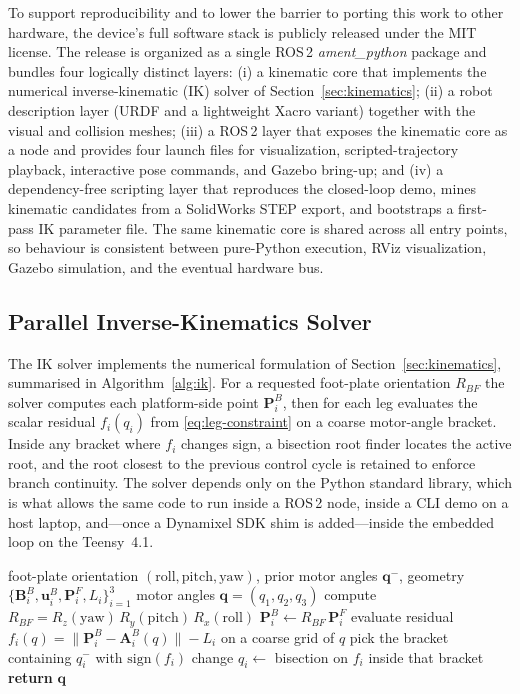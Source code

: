 \documentclass[conference]{IEEEtran}
\begin{document}
To support reproducibility and to lower the barrier to porting this work to other hardware, the device's full software stack is publicly released under the MIT license. The release is organized as a single ROS\,2 \emph{ament\_python} package and bundles four logically distinct layers: (i) a kinematic core that implements the numerical inverse-kinematic (IK) solver of Section~\ref{sec:kinematics}; (ii) a robot description layer (URDF and a lightweight Xacro variant) together with the visual and collision meshes; (iii) a ROS\,2 layer that exposes the kinematic core as a node and provides four launch files for visualization, scripted-trajectory playback, interactive pose commands, and Gazebo bring-up; and (iv) a dependency-free scripting layer that reproduces the closed-loop demo, mines kinematic candidates from a SolidWorks STEP export, and bootstraps a first-pass IK parameter file. The same kinematic core is shared across all entry points, so behaviour is consistent between pure-Python execution, RViz visualization, Gazebo simulation, and the eventual hardware bus.

\subsection{Parallel Inverse-Kinematics Solver}

The IK solver implements the numerical formulation of Section~\ref{sec:kinematics}, summarised in Algorithm~\ref{alg:ik}. For a requested foot-plate orientation $R_{BF}$ the solver computes each platform-side point $\mathbf{P}_i^B$, then for each leg evaluates the scalar residual $f_i(q_i)$ from \eqref{eq:leg-constraint} on a coarse motor-angle bracket. Inside any bracket where $f_i$ changes sign, a bisection root finder locates the active root, and the root closest to the previous control cycle is retained to enforce branch continuity. The solver depends only on the Python standard library, which is what allows the same code to run inside a ROS\,2 node, inside a CLI demo on a host laptop, and---once a Dynamixel SDK shim is added---inside the embedded loop on the Teensy~4.1.

\begin{algorithm}[!t]
\caption{Per-cycle parallel IK solver}
\label{alg:ik}
\begin{algorithmic}[1]
\REQUIRE foot-plate orientation $(\mathrm{roll},\mathrm{pitch},\mathrm{yaw})$, prior motor angles $\boldsymbol{q}^{-}$, geometry $\{\mathbf{B}_i^B,\mathbf{u}_i^B,\mathbf{P}_i^F,L_i\}_{i=1}^{3}$
\ENSURE motor angles $\boldsymbol{q}=(q_1,q_2,q_3)$
\STATE compute $R_{BF}=R_z(\mathrm{yaw})\,R_y(\mathrm{pitch})\,R_x(\mathrm{roll})$
  \STATE $\mathbf{P}_i^B \gets R_{BF}\,\mathbf{P}_i^F$
  \STATE evaluate residual $f_i(q)=\|\mathbf{P}_i^B-\mathbf{A}_i^B(q)\|-L_i$ on a coarse grid of $q$
  \STATE pick the bracket containing $q^{-}_i$ with $\mathrm{sign}(f_i)$ change
  \STATE $q_i \gets$ bisection on $f_i$ inside that bracket
\ENDFOR
\STATE \textbf{return} $\boldsymbol{q}$
\end{algorithmic}
\end{algorithm}
\end{document}
